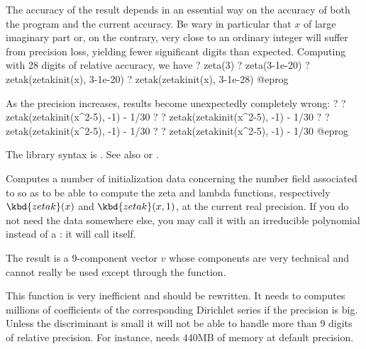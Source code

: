 \item The accuracy of the result depends in an essential way on the
accuracy of both the  program and the current accuracy.
Be wary in particular that $x$ of large imaginary part or, on the
contrary, very close to an ordinary integer will suffer from precision
loss, yielding fewer significant digits than expected. Computing with 28
digits of relative accuracy, we have
\bprog
? zeta(3)
? zeta(3-1e-20)
? zetak(zetakinit(x), 3-1e-20)
? zetak(zetakinit(x), 3-1e-28)
@eprog

\item As the precision increases, results become unexpectedly
completely wrong:
\bprog
? 
? zetak(zetakinit(x^2-5), -1) - 1/30
? 
? zetak(zetakinit(x^2-5), -1) - 1/30
? 
? zetak(zetakinit(x^2-5), -1) - 1/30
? 
? zetak(zetakinit(x^2-5), -1) - 1/30
@eprog

The library syntax is .
See also  or
.

\label{se:zetakinit}
Computes a number of initialization data
concerning the number field associated to  so as to be able
to compute the  zeta and lambda functions, respectively
$\kbd{zetak}(x)$ and $\kbd{zetak}(x,1)$, at the current real precision. If
you do not need the  data somewhere else, you may call it
with an irreducible polynomial instead of a : it will call
 itself.

The result is a 9-component vector $v$ whose components are very technical
and cannot really be used except through the  function.

This function is very inefficient and should be rewritten. It needs to
computes millions of coefficients of the corresponding Dirichlet series if
the precision is big. Unless the discriminant is small it will not be able
to handle more than 9 digits of relative precision. For instance,
 needs 440MB of memory at default precision.

